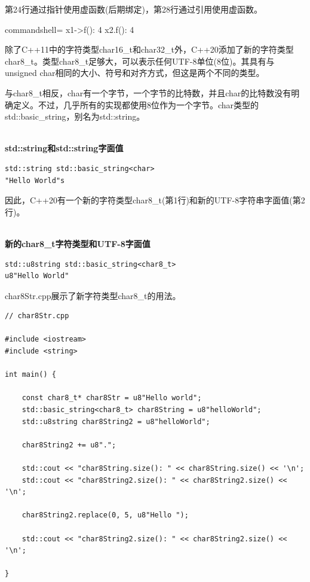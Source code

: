 第24行通过指针使用虚函数(后期绑定)，第28行通过引用使用虚函数。

\begin{tcblisting}{commandshell={}}
x1->f(): 4
x2.f(): 4
\end{tcblisting}


除了C++11中的字符类型char16\_t和char32\_t外，C++20添加了新的字符类型char8\_t。类型char8\_t足够大，可以表示任何UTF-8单位(8位)。其具有与unsigned char相同的大小、符号和对齐方式，但这是两个不同的类型。

\begin{tcolorbox}[breakable,enhanced jigsaw,colback=blue!5!white,colframe=blue!75!black,title={char和char8\_t}]

与char8\_t相反，char有一个字节，一个字节的比特数，并且char的比特数没有明确定义。不过，几乎所有的实现都使用8位作为一个字节。char类型的std::basic\_string，别名为std::string。

\hspace*{\fill} \\ %
\noindent
\textbf{std::string和std::string字面值}
\begin{lstlisting}[style=styleCXX]
std::string std::basic_string<char>
"Hello World"s
\end{lstlisting}
\end{tcolorbox}

因此，C++20有一个新的字符类型char8\_t(第1行)和新的UTF-8字符串字面值(第2行)。

\hspace*{\fill} \\ %
\noindent
\textbf{新的char8\_t字符类型和UTF-8字面值}
\begin{lstlisting}[style=styleCXX]
std::u8string std::basic_string<char8_t>
u8"Hello World"
\end{lstlisting}

char8Str.cpp展示了新字符类型char8\_t的用法。

\begin{lstlisting}[style=styleCXX]
// char8Str.cpp

#include <iostream>
#include <string>

int main() {
	
	const char8_t* char8Str = u8"Hello world";
	std::basic_string<char8_t> char8String = u8"helloWorld";
	std::u8string char8String2 = u8"helloWorld";
	
	char8String2 += u8".";
	
	std::cout << "char8String.size(): " << char8String.size() << '\n';
	std::cout << "char8String2.size(): " << char8String2.size() << '\n';
	
	char8String2.replace(0, 5, u8"Hello ");
	
	std::cout << "char8String2.size(): " << char8String2.size() << '\n';

}
\end{lstlisting}

